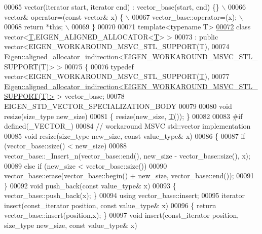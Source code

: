 \begin{DoxyCode}
00065 \textcolor{preprocessor}{    vector(iterator start, iterator end) : vector\_base(start, end) \{\}  \(\backslash\)}
00066 \textcolor{preprocessor}{    vector& operator=(const vector& x) \{  \(\backslash\)}
00067 \textcolor{preprocessor}{      vector\_base::operator=(x);  \(\backslash\)}
00068 \textcolor{preprocessor}{      return *this;  \(\backslash\)}
00069 \textcolor{preprocessor}{    \}}
00070 
00071   \textcolor{keyword}{template}<\textcolor{keyword}{typename} T>
\hyperlink{classstd_1_1vector_3_01_t_00_01_e_i_g_e_n___a_l_i_g_n_e_d___a_l_l_o_c_a_t_o_r_3_01_t_01_4_01_4}{00072}   \textcolor{keyword}{class }vector<\hyperlink{group___sparse_core___module}{T},EIGEN\_ALIGNED\_ALLOCATOR<\hyperlink{group___sparse_core___module}{T}> >
00073     : \textcolor{keyword}{public} vector<EIGEN\_WORKAROUND\_MSVC\_STL\_SUPPORT(T),
00074                     Eigen::aligned\_allocator\_indirection<EIGEN\_WORKAROUND\_MSVC\_STL\_SUPPORT(T)> >
00075 \{
00076   \textcolor{keyword}{typedef} vector<EIGEN\_WORKAROUND\_MSVC\_STL\_SUPPORT(\hyperlink{group___sparse_core___module}{T}),
00077                  
      \hyperlink{class_eigen_1_1aligned__allocator__indirection}{Eigen::aligned\_allocator\_indirection<EIGEN\_WORKAROUND\_MSVC\_STL\_SUPPORT(T)>}
       > vector\_base;
00078   EIGEN\_STD\_VECTOR\_SPECIALIZATION\_BODY
00079 
00080   \textcolor{keywordtype}{void} resize(size\_type new\_size)
00081   \{ resize(new\_size, \hyperlink{group___sparse_core___module}{T}()); \}
00082 
00083 \textcolor{preprocessor}{#if defined(\_VECTOR\_)}
00084   \textcolor{comment}{// workaround MSVC std::vector implementation}
00085   \textcolor{keywordtype}{void} resize(size\_type new\_size, \textcolor{keyword}{const} value\_type& x)
00086   \{
00087     \textcolor{keywordflow}{if} (vector\_base::size() < new\_size)
00088       vector\_base::\_Insert\_n(vector\_base::end(), new\_size - vector\_base::size(), x);
00089     \textcolor{keywordflow}{else} \textcolor{keywordflow}{if} (new\_size < vector\_base::size())
00090       vector\_base::erase(vector\_base::begin() + new\_size, vector\_base::end());
00091   \}
00092   \textcolor{keywordtype}{void} push\_back(\textcolor{keyword}{const} value\_type& x)
00093   \{ vector\_base::push\_back(x); \} 
00094   \textcolor{keyword}{using} vector\_base::insert;  
00095   iterator insert(const\_iterator position, \textcolor{keyword}{const} value\_type& x)
00096   \{ \textcolor{keywordflow}{return} vector\_base::insert(position,x); \}
00097   \textcolor{keywordtype}{void} insert(const\_iterator position, size\_type new\_size, \textcolor{keyword}{const} value\_type& x)

\end{DoxyCode}
